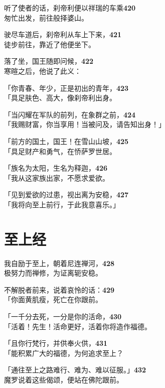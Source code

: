 听了使者的话，刹帝利便以祥瑞的车乘\hfill{\grayfootnotesize \textbf{420}} \\
匆忙出发，前往般择婆山。


驶尽车道后，刹帝利从车上下来，\hfill{\grayfootnotesize \textbf{421}} \\
徒步前往，靠近了他便坐下。


落了坐，国王随即问候，\hfill{\grayfootnotesize \textbf{422}} \\
寒暄之后，他说了此义：

「你青春、年少，正是初出的青年，\hfill{\grayfootnotesize \textbf{423}} \\
「具足肤色、高大，像刹帝利出身。


「当闪耀在军队的前列，在象群之前，\hfill{\grayfootnotesize \textbf{424}} \\
「我赐财富，你当享用！当被问及，请告知出身！」


「前方的国土，国王！在雪山山坡，\hfill{\grayfootnotesize \textbf{425}} \\
「具足财产和勇气，在㤭萨罗世居。


「族名为太阳，生名为释迦，\hfill{\grayfootnotesize \textbf{426}} \\
「我从这家族出家，不愿求爱欲。


「见到爱欲的过患，视出离为安稳，\hfill{\grayfootnotesize \textbf{427}} \\
「我将向至上前行，于此我意喜乐。」


\section{至上经}

我自励于至上，朝着尼连禅河，\hfill{\grayfootnotesize \textbf{428}} \\
极努力而禅修，为证离轭安稳。


不解脱者前来，说着哀怜的话：\hfill{\grayfootnotesize \textbf{429}} \\
「你面黄肌瘦，死亡在你跟前。


「一千分去死，一分是你的活命，\hfill{\grayfootnotesize \textbf{430}} \\
「活着！先生！活命更好，活着你将造作福德。


「且你行梵行，并供奉火供，\hfill{\grayfootnotesize \textbf{431}} \\
「能积累广大的福德，为何追求至上？


「通往至上之路难行、难为、难以征服。」\hfill{\grayfootnotesize \textbf{432}} \\
魔罗说着这些偈颂，便站在佛陀跟前。


